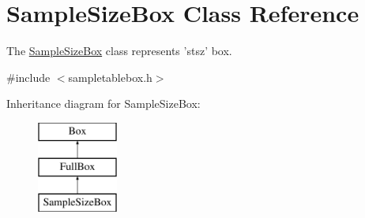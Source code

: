 \hypertarget{class_sample_size_box}{\section{Sample\-Size\-Box Class Reference}
\label{class_sample_size_box}
}


The \hyperlink{class_sample_size_box}{Sample\-Size\-Box} class represents 'stsz' box.  




{\ttfamily \#include $<$sampletablebox.\-h$>$}

Inheritance diagram for Sample\-Size\-Box\-:\begin{figure}[H]
\begin{center}
\leavevmode
\includegraphics[height=3.000000cm]{class_sample_size_box}
\end{center}
\end{figure}
